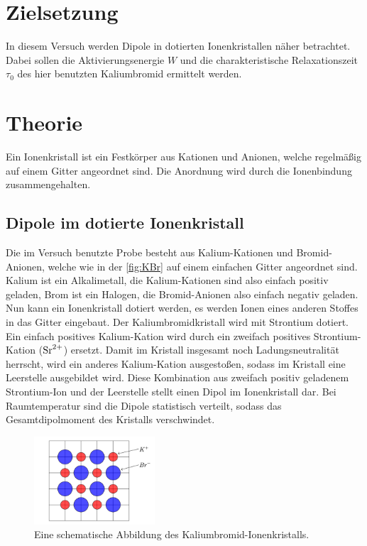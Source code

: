 \section{Zielsetzung}

    \noindent In diesem Versuch werden Dipole in dotierten Ionenkristallen näher betrachtet. Dabei sollen die Aktivierungsenergie $W$ und die charakteristische Relaxationszeit $\tau_0$ 
    des hier benutzten Kaliumbromid ermittelt werden. 


\section{Theorie}
\label{sec:Theorie}

    \noindent Ein Ionenkristall ist ein Festkörper aus Kationen und Anionen, welche regelmäßig auf einem Gitter angeordnet sind. Die Anordnung wird durch die Ionenbindung zusammengehalten. 

    \subsection{Dipole im dotierte Ionenkristall}

        \noindent Die im Versuch benutzte Probe besteht aus Kalium-Kationen und Bromid-Anionen, welche wie in der \autoref{fig:KBr} auf einem einfachen Gitter angeordnet sind. 
        Kalium ist ein Alkalimetall, die Kalium-Kationen sind also einfach positiv geladen, Brom ist ein Halogen, die Bromid-Anionen also einfach negativ geladen. 
        Nun kann ein Ionenkristall dotiert werden, es werden Ionen eines anderen Stoffes in das Gitter eingebaut. Der Kaliumbromidkristall wird mit Strontium dotiert. Ein einfach 
        positives Kalium-Kation wird durch ein zweifach positives Strontium-Kation ($\ce{Sr^{2+}}$) ersetzt. Damit im Kristall insgesamt noch Ladungsneutralität herrscht, wird ein anderes 
        Kalium-Kation ausgestoßen, sodass im Kristall eine Leerstelle ausgebildet wird. Diese Kombination aus zweifach positiv geladenem Strontium-Ion und der Leerstelle stellt einen 
        Dipol im Ionenkristall dar. Bei Raumtemperatur sind die Dipole statistisch verteilt, sodass das Gesamtdipolmoment des Kristalls verschwindet.

        \begin{figure}[h]
            \centering
            \includegraphics[width=0.4\textwidth]{bilder/Kaliumbromid.png}
            \caption{Eine schematische Abbildung des Kaliumbromid-Ionenkristalls.}
            \label{fig:KBr}
        \end{figure}

